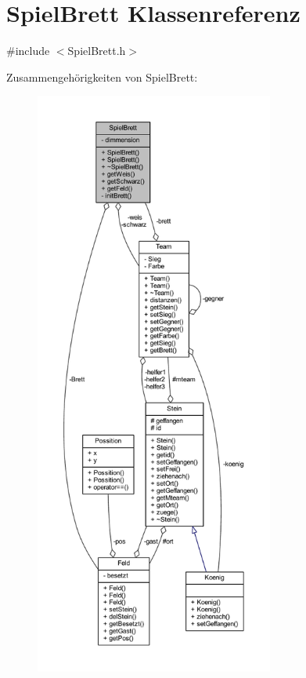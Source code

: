 \hypertarget{class_spiel_brett}{}\section{Spiel\+Brett Klassenreferenz}
\label{class_spiel_brett}


{\ttfamily \#include $<$Spiel\+Brett.\+h$>$}



Zusammengehörigkeiten von Spiel\+Brett\+:\nopagebreak
\begin{figure}[H]
\begin{center}
\leavevmode
\includegraphics[height=550pt]{class_spiel_brett__coll__graph}
\end{center}
\end{figure}
